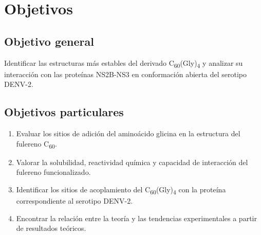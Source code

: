 \titleformat{\chapter}[display]
  {\normalfont\bfseries}{}{0pt}{\Large} %
\chapter{Objetivos}

\section{Objetivo general}
Identificar las estructuras más estables del derivado C\textsubscript{60}(Gly)\textsubscript{4} y analizar su interacción con las proteínas NS2B-NS3 en conformación abierta del serotipo DENV-2.

\section{Objetivos particulares}

\begin{enumerate}
    \item Evaluar los sitios de adición del aminoácido glicina en la estructura del fulereno C\textsubscript{60}.
    \item Valorar la solubilidad, reactividad química y capacidad de interacción del fulereno funcionalizado.
    \item Identificar los sitios de acoplamiento del C\textsubscript{60}(Gly)\textsubscript{4} con la proteína correspondiente al serotipo DENV-2.
    \item Encontrar la relación entre la teoría y las tendencias experimentales a partir de resultados teóricos.
\end{enumerate}

